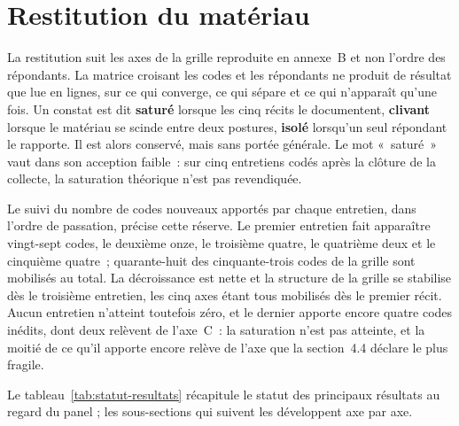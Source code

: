 
\section{Restitution du matériau}

La restitution suit les axes de la grille reproduite en annexe~B et non l'ordre des
répondants. La matrice croisant les codes et les répondants \cite{miles2003} ne produit de
résultat que lue en lignes, sur ce qui converge, ce qui sépare et ce qui n'apparaît qu'une
fois. Un constat est dit \textbf{saturé} lorsque les cinq récits le documentent,
\textbf{clivant} lorsque le matériau se scinde entre deux postures, \textbf{isolé} lorsqu'un
seul répondant le rapporte. Il est alors conservé, mais sans portée générale. Le mot
«~saturé~» vaut dans son acception faible~: sur cinq entretiens codés après la clôture de la
collecte, la saturation théorique \cite{glaser1967} n'est pas revendiquée.

Le suivi du nombre de codes nouveaux apportés par chaque entretien, dans l'ordre de
passation, précise cette réserve. Le premier entretien fait apparaître vingt-sept codes,
le deuxième onze, le troisième quatre, le quatrième deux et le cinquième quatre~;
quarante-huit des cinquante-trois codes de la grille sont mobilisés au total. La
décroissance est nette et la structure de la grille se stabilise dès le troisième
entretien, les cinq axes étant tous mobilisés dès le premier récit. Aucun entretien
n'atteint toutefois zéro, et le dernier apporte encore quatre codes inédits, dont deux relèvent de l'axe~C~: la saturation n'est pas atteinte, et la moitié de ce qu'il
apporte encore relève de l'axe que la section~4.4 déclare le plus
fragile.

Le tableau~\ref{tab:statut-resultats} récapitule le statut des principaux résultats au regard du panel ; les sous-sections qui suivent les développent axe par axe.

